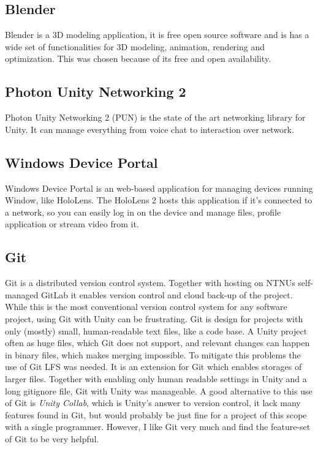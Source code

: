 \subsection*{Blender}\label{chap:blender}

Blender is a 3D modeling application, it is free open source software and is has a wide set of functionalities for 3D modeling, animation, rendering and optimization. This was chosen because of its free and open availability. 



\subsection*{Photon Unity Networking 2}\label{chap:pun}
Photon Unity Networking 2 (PUN) is the state of the art networking library for Unity. It can manage everything from voice chat to interaction over network. 


\subsection*{Windows Device Portal}\label{chap:wdp}

Windows Device Portal is an web-based application for managing devices running Window, like HoloLens. The HoloLens 2 hosts this application if it's connected to a network, so you can easily log in on the device and manage files, profile application or stream video from it.


\subsection*{Git}\label{chap:git}
Git is a distributed version control system. Together with hosting on NTNUs self-managed GitLab it enables version control and cloud back-up of the project. While this is the most conventional version control system for any software project, using Git with Unity can be frustrating. 
Git is design for projects with only (mostly) small, human-readable text files, like a code base. A Unity project often as huge files, which Git does not support, and relevant changes can happen in binary files, which makes merging impossible. To mitigate this problems the use of Git LFS was needed. It is an extension for Git which enables storages of larger files. Together with enabling only human readable settings in Unity and a long gitignore file, Git with Unity was manageable.
A good alternative to this use of Git is \textit{Unity Collab}, which is Unity's answer to version control, it lack many features found in Git, but would probably be just fine for a project of this scope with a single programmer. However, I like Git very much and find the feature-set of Git to be very helpful. 



